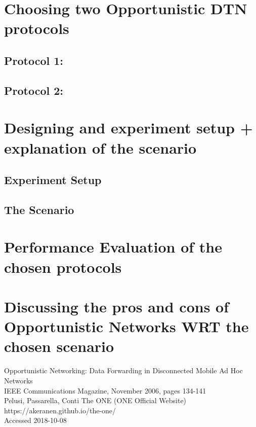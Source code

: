 \documentclass[12pt]{report}
\begin{document}
\section{Choosing two Opportunistic DTN protocols}
\subsection{Protocol 1: }
\subsection{Protocol 2: }

\section{Designing and experiment setup + explanation of the scenario}
\subsection{Experiment Setup}
\subsection{The Scenario}

\section{Performance Evaluation of the chosen protocols}

\section{Discussing the pros and cons of Opportunistic Networks WRT the chosen scenario}

\begin{thebibliography}{0}
    Opportunistic Networking: Data Forwarding in Disconnected Mobile Ad Hoc Networks\\
    IEEE Communications Magazine, November 2006, pages 134-141\\
    Pelusi, Passarella, Conti
    The ONE (ONE Official Website)\\
    https://akeranen.github.io/the-one/\\
    Accessed 2018-10-08
\end{thebibliography}
\end{document}
